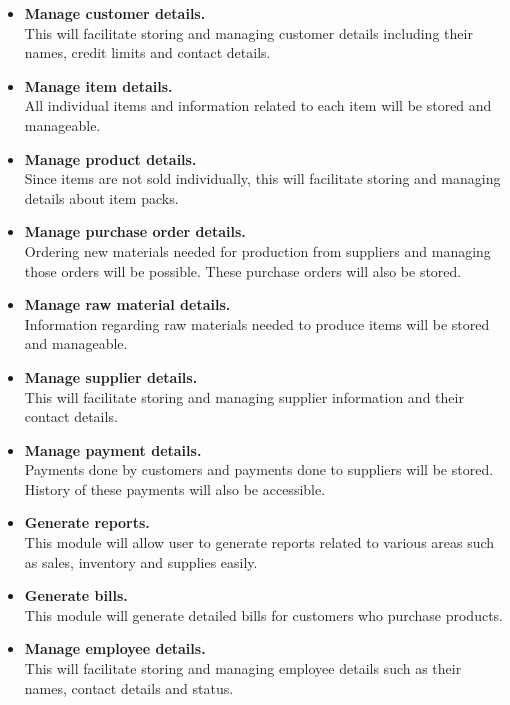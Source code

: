 \documentclass[12pt]{report}
\begin{document}
\begin{itemize}
	\item {\bf{Manage customer details.}}\\
	      This will facilitate storing and managing customer details including their names, credit limits and contact details.

	\item {\bf{Manage item details.}}\\
	      All individual items and information related to each item will be stored and manageable.

	\item {\bf{Manage product details.}}\\
	      Since items are not sold individually, this will facilitate storing and managing details about item packs.

	\item {\bf{Manage purchase order details.}}\\
	      Ordering new materials needed for production from suppliers and managing those orders will be possible. These purchase orders
	      will also be stored.

	\item {\bf{Manage raw material details.}}\\
	      Information regarding raw materials needed to produce items will be stored and manageable.

	\item {\bf{Manage supplier details.}}\\
	      This will facilitate storing and managing supplier information and their contact details.

	\item {\bf{Manage payment details.}}\\
	      Payments done by customers and payments done to suppliers will be stored. History of these payments will also be accessible.
	\item {\bf{Generate reports.}}\\
	      This module will allow user to generate reports related to various areas such as sales, inventory and supplies easily.

	\item {\bf{Generate bills.}}\\
	      This module will generate detailed bills for customers who purchase products.

	\item {\bf{Manage employee details.}}\\
	      This will facilitate storing and managing employee details such as their names, contact details and status.


\end{itemize}
\end{document}
